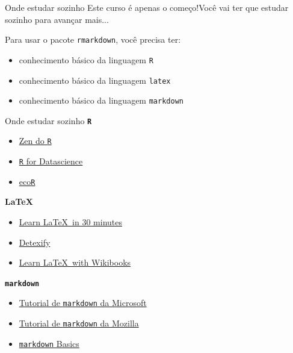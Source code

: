 \documentclass[
  10pt,
  ignorenonframetext,
]{beamer}
\providecommand{\tightlist}{%
  \setlength{\itemsep}{0pt}\setlength{\parskip}{0pt}}\usepackage{longtable,booktabs,array}
\begin{document}
\begin{frame}[fragile]{Onde estudar sozinho}
\protect\hypertarget{onde-estudar-sozinho}{}
Este curso é apenas o
começo!\newline \colorbox{cabecalho}{\textcolor{titulo}{Você vai ter que estudar sozinho para avançar mais...}}

Para usar o pacote \texttt{rmarkdown}, você precisa ter:

\begin{itemize}
\tightlist
\item
  conhecimento básico da linguagem \texttt{R}
\item
  conhecimento básico da linguagem \texttt{latex}
\item
  conhecimento básico da linguagem \texttt{markdown}
\end{itemize}
\end{frame}

\begin{frame}[fragile]{Onde estudar sozinho}
\protect\hypertarget{onde-estudar-sozinho-1}{}
\textbf{\texttt{R}}

\begin{itemize}
\tightlist
\item
  \href{https://curso-r.github.io/zen-do-r/}{Zen do \texttt{R}}
\item
  \href{https://r4ds.had.co.nz/}{\texttt{R} for Datascience}
\item
  \href{http://ecor.ib.usp.br/doku.php}{eco\texttt{R}}
\end{itemize}

\textbf{\LaTeX}

\begin{itemize}
\tightlist
\item
  \href{https://pt.overleaf.com/learn/latex/Learn_LaTeX_in_30_minutes}{Learn
  \LaTeX~in 30 minutes}
\item
  \href{https://detexify.kirelabs.org/classify.html}{Detexify}
\item
  \href{https://en.wikibooks.org/wiki/LaTeX}{Learn \LaTeX~with
  Wikibooks}
\end{itemize}

\textbf{\texttt{markdown}}

\begin{itemize}
\tightlist
\item
  \href{https://code.visualstudio.com/docs/languages/markdown}{Tutorial
  de \texttt{markdown} da Microsoft}
\item
  \href{https://developer.mozilla.org/pt-BR/docs/MDN/Writing_guidelines/Howto/Markdown_in_MDN}{Tutorial
  de \texttt{markdown} da Mozilla}
\item
  \href{https://quarto.org/docs/authoring/markdown-basics.html}{\texttt{markdown}
  Basics}
\end{itemize}
\end{frame}
\end{document}
